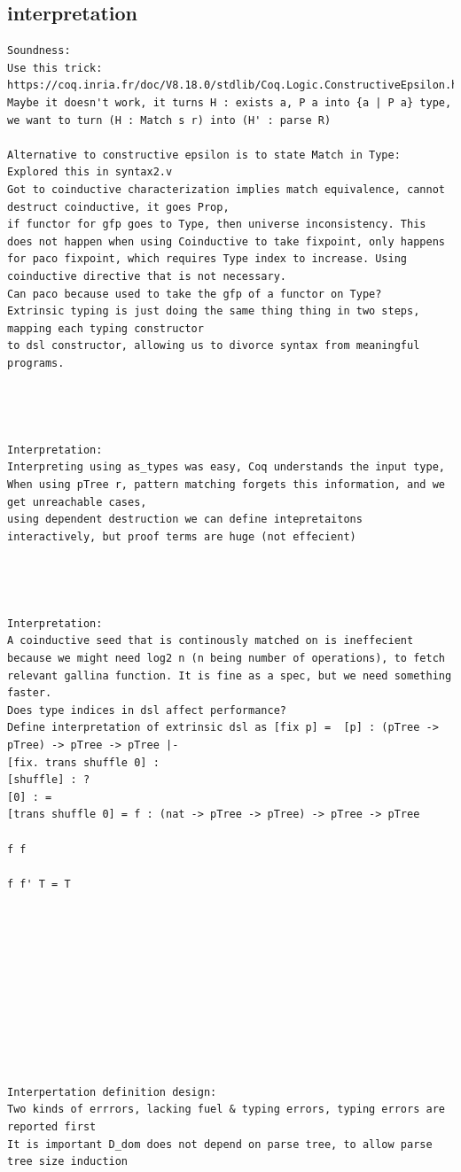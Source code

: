 \subsection{interpretation}
\begin{verbatim}
Soundness:
Use this trick: https://coq.inria.fr/doc/V8.18.0/stdlib/Coq.Logic.ConstructiveEpsilon.html
Maybe it doesn't work, it turns H : exists a, P a into {a | P a} type, we want to turn (H : Match s r) into (H' : parse R)

Alternative to constructive epsilon is to state Match in Type:
Explored this in syntax2.v
Got to coinductive characterization implies match equivalence, cannot destruct coinductive, it goes Prop,
if functor for gfp goes to Type, then universe inconsistency. This does not happen when using Coinductive to take fixpoint, only happens for paco fixpoint, which requires Type index to increase. Using coinductive directive that is not necessary. 
Can paco because used to take the gfp of a functor on Type?
Extrinsic typing is just doing the same thing thing in two steps, mapping each typing constructor 
to dsl constructor, allowing us to divorce syntax from meaningful programs.




Interpretation:
Interpreting using as_types was easy, Coq understands the input type,
When using pTree r, pattern matching forgets this information, and we get unreachable cases,
using dependent destruction we can define intepretaitons interactively, but proof terms are huge (not effecient)




Interpretation:
A coinductive seed that is continously matched on is ineffecient because we might need log2 n (n being number of operations), to fetch relevant gallina function. It is fine as a spec, but we need something faster.
Does type indices in dsl affect performance?
Define interpretation of extrinsic dsl as [fix p] =  [p] : (pTree -> pTree) -> pTree -> pTree |- 
[fix. trans shuffle 0] : 
[shuffle] : ?
[0] : =
[trans shuffle 0] = f : (nat -> pTree -> pTree) -> pTree -> pTree 

f f

f f' T = T











Interpertation definition design:
Two kinds of errrors, lacking fuel & typing errors, typing errors are reported first
It is important D_dom does not depend on parse tree, to allow parse tree size induction


\end{verbatim}
